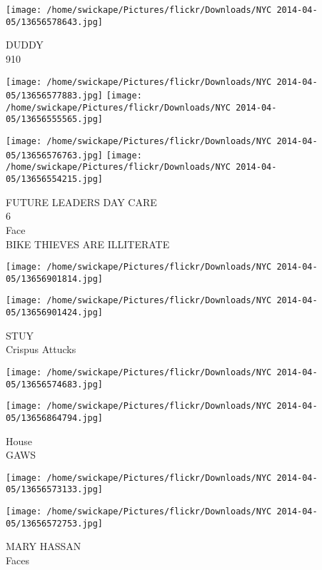 \documentclass[10pt,letterpaper]{article}
\begin{document}
\vspace{0.25in}
\texttt{[image: /home/swickape/Pictures/flickr/Downloads/NYC 2014-04-05/13656578643.jpg]}

DUDDY\\
910\\
\pagebreak

\texttt{[image: /home/swickape/Pictures/flickr/Downloads/NYC 2014-04-05/13656577883.jpg]}
\texttt{[image: /home/swickape/Pictures/flickr/Downloads/NYC 2014-04-05/13656555565.jpg]}

\texttt{[image: /home/swickape/Pictures/flickr/Downloads/NYC 2014-04-05/13656576763.jpg]}
\texttt{[image: /home/swickape/Pictures/flickr/Downloads/NYC 2014-04-05/13656554215.jpg]}

FUTURE LEADERS DAY CARE\\
6\\
Face\\
BIKE THIEVES ARE ILLITERATE\\
\pagebreak

\texttt{[image: /home/swickape/Pictures/flickr/Downloads/NYC 2014-04-05/13656901814.jpg]}

\vspace{0.25in}
\texttt{[image: /home/swickape/Pictures/flickr/Downloads/NYC 2014-04-05/13656901424.jpg]}

STUY\\
Crispus Attucks\\
\pagebreak

\texttt{[image: /home/swickape/Pictures/flickr/Downloads/NYC 2014-04-05/13656574683.jpg]}

\vspace{0.25in}
\texttt{[image: /home/swickape/Pictures/flickr/Downloads/NYC 2014-04-05/13656864794.jpg]}

House\\
GAWS\\
\pagebreak

\texttt{[image: /home/swickape/Pictures/flickr/Downloads/NYC 2014-04-05/13656573133.jpg]}

\vspace{0.25in}
\texttt{[image: /home/swickape/Pictures/flickr/Downloads/NYC 2014-04-05/13656572753.jpg]}

MARY HASSAN\\
Faces\\
\pagebreak
\end{document}
